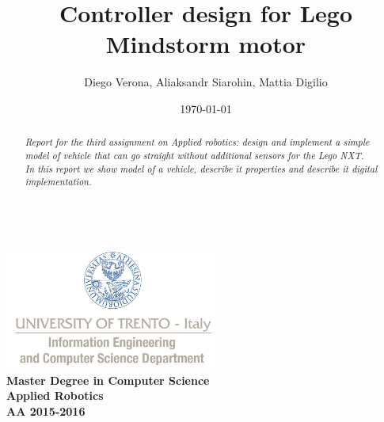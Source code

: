 \documentclass[a4paper,12pt,oneside]{article}
\title{Controller design for Lego Mindstorm motor}
\author{Diego Verona, Aliaksandr Siarohin, Mattia Digilio}
\date{\today}
\begin{document}
\makeatletter  %
\begin{titlepage}
      \centering
      ~~~~~~~~~~~~~\\[-30mm]
      \includegraphics[keepaspectratio=true, width=7cm]{bg_eng_1r.jpg} \\[10mm]

     {
     \large \bfseries Master Degree in Computer Science\\[3mm] 
     Applied Robotics\\[3mm]
     AA 2015-2016
     }\\[10mm]


     \vspace{0.5cm}
     {
     \Large \bfseries \textcolor{blue}{\@title} \par
     }
     \vspace{0.5cm}
     \vspace{0.2cm}

     {\large {\@author}}
     \\ \vspace{.2cm}
     \@date

     \vspace{0.6cm}


\begin{abstract}

\textit{
  Report for the third assignment on Applied robotics: design and implement a simple model of vehicle that can go straight without additional sensors for the Lego NXT.\\In this report we show model of a vehicle, describe it properties and describe it digital implementation.
}


\end{abstract}

\end{titlepage}
\end{document}
